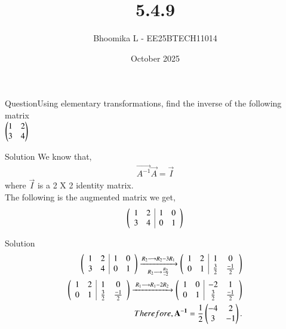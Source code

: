 \documentclass{beamer}
\title %
{5.4.9}
\date{October  2025}
\author %
{Bhoomika L - EE25BTECH11014}
\begin{document}
\frame{\titlepage}
\begin{frame}{Question}Using elementary transformations, find the inverse of the following matrix\\
\centering$\begin{pmatrix}1&2\\3&4\end{pmatrix}$
\end{frame}

\begin{frame}{Solution}
We know that,
\begin{align}
     \vec{A^{-1}}\vec{A}=\vec{I}
\end{align}
     where $\vec{I}$ is a 2 X 2 identity matrix.\\
      The following is the augmented matrix we get,
      \begin{align}
           \begin{pmatrix}
    \begin{array}{cc|cc}
      1 & 2 & 1 & 0 \\ 
      3 & 4 & 0 & 1
    \end{array}
  \end{pmatrix} \end{align}
\end{frame}

\begin{frame}{Solution}
\begin{align}
     \begin{pmatrix}
    \begin{array}{cc|cc}
      1 & 2 & 1 & 0 \\ 
      3 & 4 & 0 & 1
    \end{array}                    
  \end{pmatrix}                                 
\xrightarrow[R_2 \longrightarrow \frac{R_2}{-2}]{R_2 \longrightarrow R_2 - 3 R_1}  \begin{pmatrix}
    \begin{array}{cc|cc}
      1 & 2 & 1 & 0 \\ 
      0 & 1 & \frac{3}{2} & \frac{-1}{2}
    \end{array}
  \end{pmatrix}\\
   \begin{pmatrix}\begin{array}{cc|cc}
      1 & 2 & 1 & 0 \\ 
      0 & 1 & \frac{3}{2} & \frac{-1}{2}
    \end{array}
  \end{pmatrix}\xrightarrow{\;R_1\longrightarrow R_1-2R_2\;}   \begin{pmatrix}\begin{array}{cc|cc}
      1 & 0 & -2 & 1 \\ 
      0 & 1 & \frac{3}{2} & \frac{-1}{2}
 \end{array}\end{pmatrix}\\
 Therefore,\mathbf{A^{-1}}=\frac{1}{2}\begin{pmatrix}-4 & 2 \\3 & -1\end{pmatrix}.
\end{align}
\end{frame}
\end{document}
